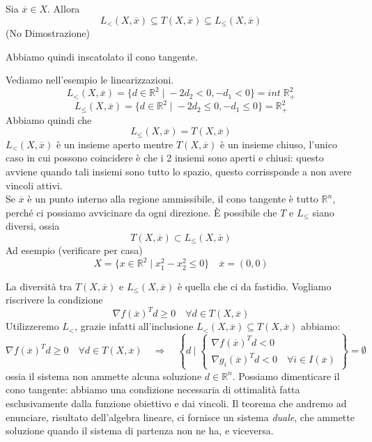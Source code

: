 \begin{proposition}
  Sia $\overline{x} \in X $.
 Allora
 $$L_{<} (X, \overline{x}) \subseteq T(X, \overline{x})
 \subseteq L_{\leq}(X, \overline{x}) $$
(No Dimostrazione)
\end{proposition}
Abbiamo quindi inscatolato il cono tangente.
\begin{example}
Vediamo nell'esempio le linearizzazioni.
$$ L_{<}(X, \overline{x}) = \{ d \in \mathbb{R}^{2} \; | \;
-2 d_2 < 0, - d_1 < 0 \}  = int\; \mathbb{R}^{2}_{+}$$
$$ L_{\leq}(X, \overline{x}) = \{ d \in \mathbb{R}^{2} \; | \;
-2 d_2 \leq 0, - d_1 \leq 0 \}  =  \mathbb{R}^{2}_{+}$$
Abbiamo quindi che
$$ L_{\leq}(X, \overline{x}) = T(X, \overline{x})$$
$L_{<}(X, \overline{x})$ \`e un insieme aperto mentre $T(X, \overline{x})$ \`e un insieme chiuso,
l'unico caso in cui possono coincidere \`e che i 2 insiemi sono aperti e
chiusi: questo avviene quando tali insiemi sono tutto lo spazio, questo
corrissponde a non avere vincoli attivi. \\
Se $\overline{x}$ \`e un punto interno alla regione ammissibile,
il cono tangente \`e tutto $\mathbb{R}^{n}$, perch\'e ci possiamo
avvicinare da ogni direzione.
\`E possibile che $T$ e $L_{\leq}$ siano diversi, ossia
$$ T(X, \overline{x}) \subset L_{\leq}(X, \overline{x})$$
Ad esempio (verificare per casa)
$$ X = \{ x \in \mathbb{R}^{2} \; | \; x_1^{2} - x_2^{2} \leq 0 \}
\quad \overline{x} = (0,0)
$$
\end{example}
La diversit\`a tra $T(X, \overline{x}) $ e $L_{\leq}(X, \overline{x})$ \`e quella che ci da fastidio.
Vogliamo riscrivere la condizione
$$ \nabla f(\overline{x})^{T} d \geq 0 \quad
\forall d \in T(X, \overline{x}) $$
Utilizzeremo $L_{<}$, grazie infatti all'inclusione
$L_{<}(X, \overline{x}) \subseteq T(X, \overline{x})$ abbiamo:
$$
\nabla f(\overline{x})^{T} d \geq 0 \quad
\forall d \in T(X, \overline{x})
\quad \Longrightarrow \quad
\left\lbrace d ~| \; \left\{
\begin{array}{l}
\nabla f(\overline{x})^{T} d < 0 \\
 \nabla  g_i(\overline{x})^{T} d < 0 \quad \forall i \in I(\overline{x})
\end{array}
\right.
\right\rbrace
= \emptyset
$$
ossia il sistema non ammette alcuna soluzione
$d \in \mathbb{R}^{n}$.
Possiamo dimenticare il cono tangente: abbiamo una condizione
necessaria di ottimalit\`a fatta esclusivamente dalla funzione
obiettivo e dai vincoli. Il teorema che andremo ad enunciare,
risultato dell'algebra lineare, ci fornisce un sistema \emph{duale},
che ammette soluzione quando il sistema di partenza non ne ha, 
e viceversa.

